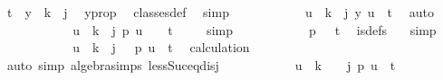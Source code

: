 \begin{isabellebody}
\ {\isachardoublequoteopen}t\ {\isasymnotin}\ y\ {\isacharbackquote}{\kern0pt}\ {\isacharbraceleft}{\kern0pt}{\isachardot}{\kern0pt}{\isachardot}{\kern0pt}{\isacharless}{\kern0pt}{\isacharparenleft}{\kern0pt}k\ {\isacharminus}{\kern0pt}\ j{\isacharparenright}{\kern0pt}{\isacharbraceright}{\kern0pt}{\isachardoublequoteclose}\ \isamarkupfalse%
\ y{\isacharunderscore}{\kern0pt}prop\ \isamarkupfalse%
\ classes{\isacharunderscore}{\kern0pt}def\ \isamarkupfalse%
\ simp\isanewline
\ \ \ \ \ \ \ \ \isamarkupfalse%
\ \isamarkupfalse%
\ {\isachardoublequoteopen}{\isasymforall}u\ {\isacharless}{\kern0pt}\ k\ {\isacharminus}{\kern0pt}\ j{\isachardot}{\kern0pt}\ y\ u\ {\isasymnoteq}\ t{\isachardoublequoteclose}\ \isamarkupfalse%
\ auto\isanewline
\ \ \ \ \ \ \ \ \isamarkupfalse%
\ \isamarkupfalse%
\ {\isachardoublequoteopen}{\isasymforall}u\ {\isacharless}{\kern0pt}\ k\ {\isacharminus}{\kern0pt}\ j{\isachardot}{\kern0pt}\ p\ {\isacharparenleft}{\kern0pt}u\ {\isacharplus}{\kern0pt}\ {}{\isacharparenright}{\kern0pt}\ {\isasymnoteq}\ t{\isachardoublequoteclose}\ \isamarkupfalse%
\ {\isacharasterisk}{\kern0pt}{\isacharasterisk}{\kern0pt}\ \isamarkupfalse%
\ simp\isanewline
\ \ \ \ \ \ \ \ \isamarkupfalse%
\ \isamarkupfalse%
\ {\isachardoublequoteopen}p\ {}\ {\isasymnoteq}\ t{\isachardoublequoteclose}\ \isamarkupfalse%
\ is{\isacharunderscore}{\kern0pt}defs\ {\isacharasterisk}{\kern0pt}{\isacharasterisk}{\kern0pt}\ \isamarkupfalse%
\ simp\isanewline
\ \ \ \ \ \ \ \ \isamarkupfalse%
\ \isamarkupfalse%
\ {\isachardoublequoteopen}{\isasymforall}u\ {\isacharless}{\kern0pt}\ k\ {\isacharminus}{\kern0pt}\ j\ {\isacharplus}{\kern0pt}\ {}{\isachardot}{\kern0pt}\ p\ u\ {\isasymnoteq}\ t{\isachardoublequoteclose}\ \isamarkupfalse%
\ calculation\ \isamarkupfalse%
\ {\isacharparenleft}{\kern0pt}auto\ simp{\isacharcolon}{\kern0pt}\ algebra{\isacharunderscore}{\kern0pt}simps\ less{\isacharunderscore}{\kern0pt}Suc{\isacharunderscore}{\kern0pt}eq{\isacharunderscore}{\kern0pt}{}{\isacharunderscore}{\kern0pt}disj{\isacharparenright}{\kern0pt}\isanewline
\ \ \ \ \ \ \ \ \isamarkupfalse%
\ \isamarkupfalse%
\ {\isachardoublequoteopen}{\isasymforall}u\ {\isacharless}{\kern0pt}\ {\isacharparenleft}{\kern0pt}k\ {\isacharplus}{\kern0pt}\ {}{\isacharparenright}{\kern0pt}\ {\isacharminus}{\kern0pt}\ j{\isachardot}{\kern0pt}\ p\ u\ {\isasymnoteq}\ t{\isachardoublequoteclose}\ \isamarkupfalse%

\end{isabellebody}
